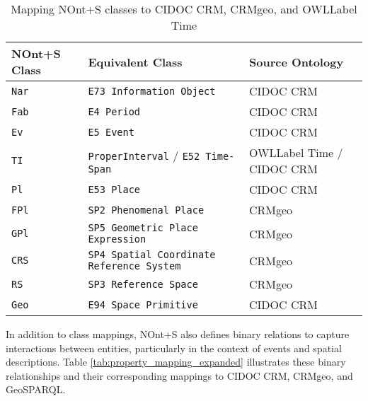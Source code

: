 \begin{table}[h!]
\centering
\caption{Mapping NOnt+S classes to CIDOC CRM, CRMgeo, and \acrshort{OWLLabel} Time}
\label{tab:mapping}
\begin{tabular}{|l|l|l|}
\hline
\textbf{NOnt+S Class} & \textbf{Equivalent Class} & \textbf{Source Ontology} \\ \hline
\texttt{Nar} & \texttt{E73 Information Object} & CIDOC CRM \\ \hline
\texttt{Fab} & \texttt{E4 Period} & CIDOC CRM \\ \hline
\texttt{Ev} & \texttt{E5 Event} & CIDOC CRM \\ \hline
\texttt{TI} & \texttt{ProperInterval} / \texttt{E52 Time-Span} & \acrshort{OWLLabel} Time / CIDOC CRM \\ \hline
\texttt{Pl} & \texttt{E53 Place} & CIDOC CRM \\ \hline
\texttt{FPl} & \texttt{SP2 Phenomenal Place} & CRMgeo \\ \hline
\texttt{GPl} & \texttt{SP5 Geometric Place Expression} & CRMgeo \\ \hline
\texttt{CRS} & \texttt{SP4 Spatial Coordinate Reference System} & CRMgeo \\ \hline
\texttt{RS} & \texttt{SP3 Reference Space} & CRMgeo \\ \hline
\texttt{Geo} & \texttt{E94 Space Primitive} & CIDOC CRM \\ \hline
\end{tabular}
\end{table}

In addition to class mappings, NOnt+S also defines binary relations to capture interactions between entities, particularly in the context of events and spatial descriptions. Table \ref{tab:property_mapping_expanded} illustrates these binary relationships and their corresponding mappings to CIDOC CRM, CRMgeo, and GeoSPARQL.

